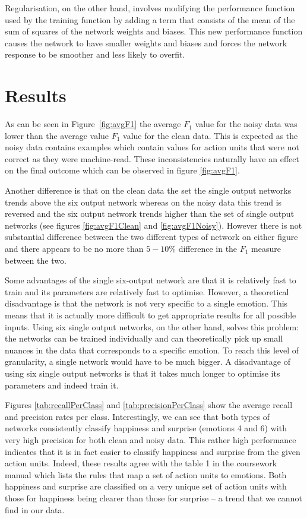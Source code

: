 \documentclass[10pt,a4paper]{article}
\begin{document}
Regularisation, on the other hand, involves modifying the performance function used by the training function by adding a term that consists of the mean of the sum of squares of the network weights and biases. This new performance function causes the network to have smaller weights and biases and forces the network response to be smoother and less likely to overfit.

\section{Results}

As can be seen in Figure~\ref{fig:avgF1} the average $F_1$ value for the noisy data was lower than the average value $F_1$ value for the clean data. This is expected as the noisy data contains examples which contain values for action units that were not correct as they were machine-read. These inconsistencies naturally have an effect on the final outcome which can be observed in figure \ref{fig:avgF1}.

Another difference is that on the clean data the set the single output networks trends above the six output network whereas on the noisy data this trend is reversed and the six output network trends higher than the set of single output networks (see figures \ref{fig:avgF1Clean} and \ref{fig:avgF1Noisy}). However there is not substantial difference between the two different types of network on either figure and there appears to be no more than $5-10\%$ difference in the $F_1$ measure between the two.

Some advantages of the single six-output network are that it is relatively fast to train and its parameters are relatively fast to optimise. However, a theoretical disadvantage is that the network is not very specific to a single emotion. This means that it is actually more difficult to get appropriate results for all possible inputs. Using six single output networks, on the other hand, solves this problem: the networks can be trained individually and can theoretically pick up small nuances in the data that corresponds to a specific emotion. To reach this level of granularity, a single network would have to be much bigger. A disadvantage of using six single output networks is that it takes much longer to optimise its parameters and indeed train it.

Figures \ref{tab:recallPerClass}  and \ref{tab:precisionPerClass} show the average recall and precision rates per class. Interestingly, we can see that both types of networks consistently classify happiness and surprise (emotions 4 and 6) with very high precision for both clean and noisy data. This rather high performance indicates that it is in fact easier to classify happiness and surprise from the given action units. Indeed, these results agree with the table 1 in the coursework manual which lists the rules that map a set of action units to emotions. Both happiness and surprise are classified on a very unique set of action units with those for happiness being clearer than those for surprise -- a trend that we cannot find in our data.
\end{document}
